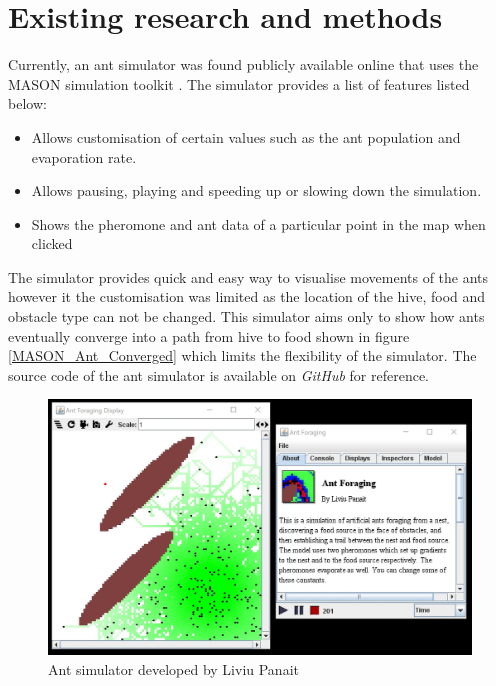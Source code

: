 \documentclass[a4paper, oneside, 11pt]{report}
\begin{document}
\section{Existing research and methods}
Currently, an ant simulator was found publicly available online that uses the MASON simulation toolkit \citep{Mason}. The simulator provides a list of features listed below:
\begin{itemize}
	\item Allows customisation of certain values such as the ant population and evaporation rate.
	\item Allows pausing, playing and speeding up or slowing down the simulation.
	\item Shows the pheromone and ant data of a particular point in the map when clicked
\end{itemize}

The simulator provides quick and easy way to visualise movements of the ants however it the customisation was limited as the location of the hive, food and obstacle type can not be changed. This simulator aims only to show how ants eventually converge into a path from hive to food shown in figure \ref{MASON_Ant_Converged} which limits the flexibility of the simulator. The source code of the ant simulator is available on \textit{GitHub} for reference.

\begin{figure}[htb]
	\includegraphics[width=1.0 \columnwidth]{MASON_Ant.jpg}
	\caption{Ant simulator developed by Liviu Panait \citep{Ant_Simulator}}
	\label{MASON_Ant}
\end{figure}
\end{document}
